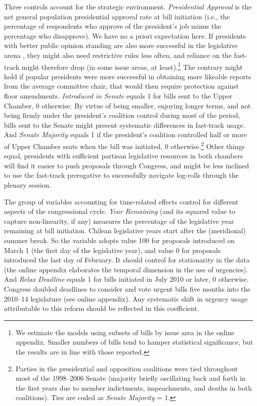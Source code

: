 \documentclass[letter,12pt]{article}
\begin{document}
Three controls account for the strategic environment. \emph{Presidential Approval} is the net general population presidential approval rate at bill initiation (i.e., the percentage of respondents who approve of the president's job minus the percentage who disapprove). We have no a priori expectation here. If presidents with better public opinion standing are also more successful in the legislative arena \citep{bond.fleisher.1990,aleman.navia.UrgChi.2009}, they might also need restrictive rules less often, and reliance on the fast-track might therefore drop (in some issue areas, at least).\footnote{We estimate the models using subsets of bills by issue area in the online appendix. Smaller numbers of bills tend to hamper statistical significance, but the results are in line with those reported.} The contrary might hold if popular presidents were more successful in obtaining more likeable reports from the average committee chair, that would then require protection against floor amendments. \emph{Introduced in Senate} equals 1 for bills sent to the Upper Chamber, 0 otherwise. By virtue of being smaller, enjoying longer terms, and not being firmly under the president's coalition control during most of the period, bills sent to the Senate might present systematic differences in fast-track usage. And \emph{Senate Majority} equals 1 if the president's coalition controlled half or more of Upper Chamber seats when the bill was initiated, 0 otherwise.\footnote{Parties in the presidential and opposition coalitions were tied throughout most of the 1998--2006 Senate (majority briefly oscillating back and forth in the first years due to member indictments, impeachments, and deaths in both coalitions). Ties are coded as \emph{Senate Majority} = 1.} Other things equal, presidents with sufficient partisan legislative resources in both chambers will find it easier to push proposals through Congress, and might be less inclined to use the fast-track prerogative to successfully navigate log-rolls through the plenary session.

The group of variables accounting for time-related effects control for different aspects of the congressional cycle. \emph{Year Remaining} (and its squared value to capture non-linearity, if any) measures the percentage of the legislative year remaining at bill initiation. Chilean legislative years start after the (meridional) summer break. So the variable adopts value 100 for proposals introduced on March 1 (the first day of the legislative year), and value 0 for proposals introduced the last day of February. It should control for stationarity in the data (the online appendix elaborates the temporal dimension in the use of urgencies). And \emph{Relax Deadline} equals 1 for bills initiated in July 2010 or later, 0 otherwise. Congress doubled deadlines to consider and vote urgent bills five months into the 2010--14 legislature (see online appendix). Any systematic shift in urgency usage attributable to this reform should be reflected in this coefficient. 
\end{document}
